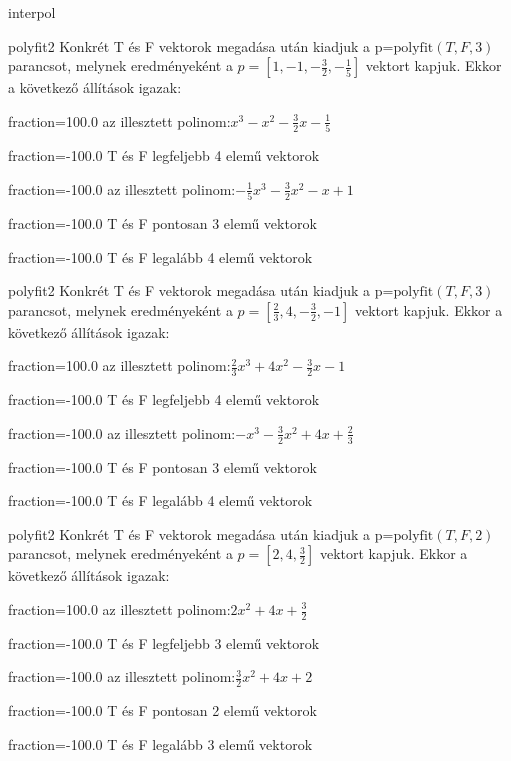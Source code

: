 \documentclass[12pt]{article}
\begin{document}
\begin{quiz}{interpol}
\begin{multi}[multiple]{polyfit2}
Konkrét T és F vektorok megadása után kiadjuk a p=$\mathrm{polyfit}(T,F,3)$
parancsot, melynek eredményeként a $p=\left[1,-1,-\frac{3}{2},-\frac{1}{5}\right]$ vektort kapjuk.
Ekkor a következő állítások igazak:
\item[fraction=100.0] az illesztett polinom:$x^3-x^2-\frac{3}{2}x-\frac{1}{5}$
\item[fraction=-100.0]  T és F legfeljebb 4 elemű vektorok
\item[fraction=-100.0]  az illesztett polinom:$-\frac{1}{5}x^3-\frac{3}{2}x^2-x+1$
\item[fraction=-100.0]  T és F pontosan 3 elemű vektorok
\item[fraction=-100.0] T és F legalább 4 elemű vektorok
\end{multi}
\begin{multi}[multiple]{polyfit2}
Konkrét T és F vektorok megadása után kiadjuk a p=$\mathrm{polyfit}(T,F,3)$
parancsot, melynek eredményeként a $p=\left[\frac{2}{3},4,-\frac{3}{2},-1\right]$ vektort kapjuk.
Ekkor a következő állítások igazak:
\item[fraction=100.0] az illesztett polinom:$\frac{2}{3}x^3+4x^2-\frac{3}{2}x-1$
\item[fraction=-100.0]  T és F legfeljebb 4 elemű vektorok
\item[fraction=-100.0]  az illesztett polinom:$-x^3-\frac{3}{2}x^2+4x+\frac{2}{3}$
\item[fraction=-100.0]  T és F pontosan 3 elemű vektorok
\item[fraction=-100.0] T és F legalább 4 elemű vektorok
\end{multi}
\begin{multi}[multiple]{polyfit2}
Konkrét T és F vektorok megadása után kiadjuk a p=$\mathrm{polyfit}(T,F,2)$
parancsot, melynek eredményeként a $p=\left[2,4,\frac{3}{2}\right]$ vektort kapjuk.
Ekkor a következő állítások igazak:
\item[fraction=100.0] az illesztett polinom:$2x^2+4x+\frac{3}{2}$
\item[fraction=-100.0]  T és F legfeljebb 3 elemű vektorok
\item[fraction=-100.0]  az illesztett polinom:$\frac{3}{2}x^2+4x+2$
\item[fraction=-100.0]  T és F pontosan 2 elemű vektorok
\item[fraction=-100.0] T és F legalább 3 elemű vektorok
\end{multi}

\end{quiz}
\end{document}
